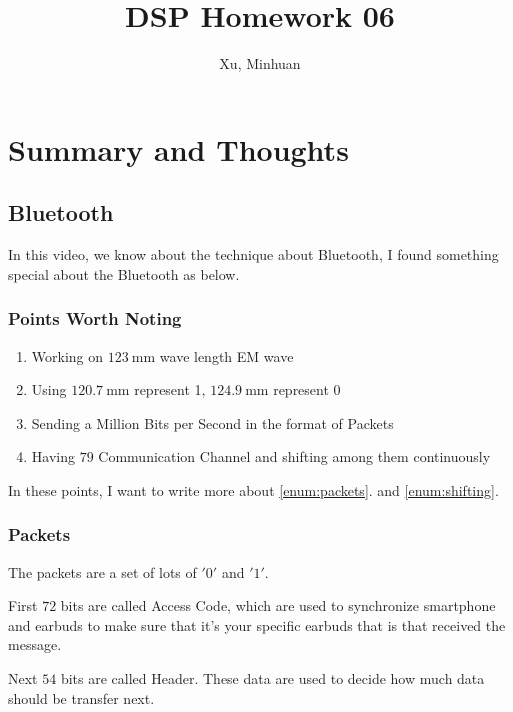 \documentclass{article}
\begin{document}
\title{DSP Homework 06}
\author{Xu, Minhuan}
\maketitle
\tableofcontents
\begin{abstract}
    
\end{abstract}

\section{Summary and Thoughts}

\subsection{Bluetooth}
In this video, we know about the technique about Bluetooth, I found something special about the Bluetooth as below.

\subsubsection*{Points Worth Noting}
\begin{enumerate}
    \item Working on $123~\mathrm{mm}$ wave length EM wave
    \item Using $120.7~\mathrm{mm}$ represent 1, $124.9 ~ \mathrm{mm}$ represent 0
    \item Sending a Million Bits per Second in the format of {Packets} \label{enum:packets}
    \item Having $79$ Communication Channel and {shifting} among them continuously \label{enum:shifting}
\end{enumerate}

In these points, I want to write more about \ref{enum:packets}. and \ref{enum:shifting}.

\subsubsection*{Packets}
The packets are a set of lots of $'0'$ and $'1'$. 

First $72$ bits are called {Access Code}, which are used to synchronize smartphone and earbuds to make sure that it's your specific earbuds that is that received the message. 

Next $54$ bits are called {Header}. These data are used to decide how much data should be transfer next.
\end{document}
